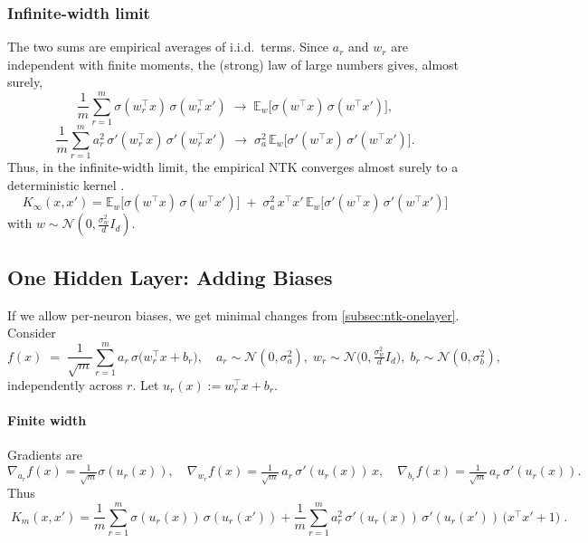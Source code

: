\subsubsection*{Infinite-width limit}
The two sums are empirical averages of i.i.d.\ terms. Since $a_r$ and $w_r$ are independent with finite moments,
the (strong) law of large numbers gives, almost surely,
\[
	\frac{1}{m}\sum_{r=1}^m \sigma(w_r^\top x)\,\sigma(w_r^\top x')
	\;\longrightarrow\;
	\mathbb E_{w}\big[\sigma(w^\top x)\,\sigma(w^\top x')\big],
\]
\[
	\frac{1}{m}\sum_{r=1}^m a_r^2\,\sigma'(w_r^\top x)\,\sigma'(w_r^\top x')
	\;\longrightarrow\;
	\sigma_a^2\,\mathbb E_{w}\big[\sigma'(w^\top x)\,\sigma'(w^\top x')\big].
\]
Thus, in the infinite-width limit, the empirical NTK converges almost surely to a deterministic kernel
\citep{jacot2018ntk, lee2019wide}.
\[
	\boxed{\;
		K_\infty(x,x')
		=\mathbb E_{w}\!\big[\sigma(w^\top x)\,\sigma(w^\top x')\big]
		\;+\;
		\sigma_a^2\,x^\top x'\,\mathbb E_{w}\!\big[\sigma'(w^\top x)\,\sigma'(w^\top x')\big]}
	\;
\]
with $w\sim \mathcal N(0,\frac{\sigma_w^2}{d}I_d)$.


\subsection{One Hidden Layer: Adding Biases}\label{subsec:ntk-onelayer-bias}

If we allow per-neuron biases, we get minimal changes from \autoref{subsec:ntk-onelayer}.
Consider
\[
	f(x)\;=\;\frac{1}{\sqrt{m}}\sum_{r=1}^m a_r\,\sigma\!\big(w_r^\top x + b_r\big),
	\quad
	a_r \sim \mathcal N(0,\sigma_a^2),\;
	w_r \sim \mathcal N\!\Big(0,\tfrac{\sigma_w^2}{d}I_d\Big),\;
	b_r \sim \mathcal N(0,\sigma_b^2),
\]
independently across $r$. Let $u_r(x):=w_r^\top x + b_r$.

\paragraph{Finite width}

Gradients are
\[
	\nabla_{a_r} f(x)=\tfrac{1}{\sqrt{m}}\sigma(u_r(x)),\quad
	\nabla_{w_r} f(x)=\tfrac{1}{\sqrt{m}}\,a_r\,\sigma'(u_r(x))\,x,\quad
	\nabla_{b_r} f(x)=\tfrac{1}{\sqrt{m}}\,a_r\,\sigma'(u_r(x)).
\]
Thus
\[
	\boxed{\;
		K_m(x,x')
		=\frac{1}{m}\sum_{r=1}^m \sigma(u_r(x))\,\sigma(u_r(x'))
		+\frac{1}{m}\sum_{r=1}^m a_r^2\,\sigma'(u_r(x))\,\sigma'(u_r(x'))\,\big(x^\top x' + 1\big)\; }.
\]

